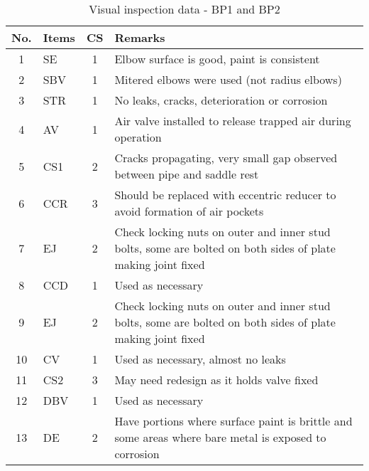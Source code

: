 
\begin{table}[!htb]
	\caption{Visual inspection data - BP1 and BP2}
	\label{ch04_visualinspectionbp1}
		{\scriptsize
\begin{tabular}{c|l|c|p{12cm}}
	\hline
	No. & Items & CS & Remarks \\ 
\hline
1 & SE & 1 & Elbow surface is good, paint is consistent \\ 
2 & SBV & 1 & Mitered elbows were used (not radius elbows) \\ 
3 & STR & 1 & No leaks, cracks, deterioration or corrosion  \\ 
4 & AV & 1 & Air valve installed to release trapped air during operation \\ 
5 & CS1 & 2 & Cracks propagating, very small gap observed between pipe and saddle rest \\ 
6 & CCR & 3 & Should be replaced with eccentric reducer to avoid formation of air pockets \\ 
7 & EJ & 2 & Check locking nuts on outer and inner stud bolts, some are bolted on both sides of plate making joint fixed \\ 
8 & CCD & 1 & Used as necessary \\ 
9 & EJ & 2 & Check locking nuts on outer and inner stud bolts, some are bolted on both sides of plate making joint fixed \\ 
10 & CV & 1 & Used as necessary, almost no leaks \\ 
11 & CS2 & 3 & May need redesign as it holds valve fixed \\ 
12 & DBV & 1 & Used as necessary \\ 
13 & DE & 2 & Have portions where surface paint is brittle and some areas where bare metal is exposed to corrosion \\ 
\hline
\end{tabular}
	}
\end{table}


